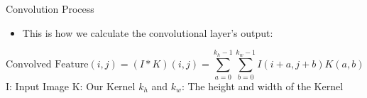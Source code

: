 \documentclass[default, aspectratio=169]{beamer}
\begin{document}
	\begin{frame}{Convolution Process}
		\begin{itemize}
			\item \normalsize This is how we calculate the convolutional layer's output:
		\end{itemize}
		\small
		\begin{equation*}
			\text{Convolved Feature}(i, j) = (I * K)(i, j) = \sum_{a=0}^{k_h - 1} \sum_{b=0}^{k_w - 1} I(i+a, j+b) K(a, b)
		\end{equation*}
		I: Input Image\newline
		K: Our Kernel\newline
		$k_h$ and $k_w$: The height and width of the Kernel
		
	\end{frame}
	
\end{document}
